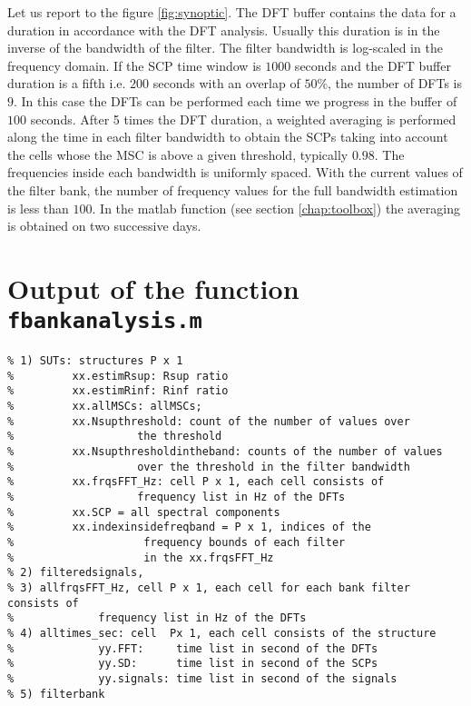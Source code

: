 Let us report to the figure \ref{fig:synoptic}. The DFT buffer contains the data for a duration in accordance with the DFT analysis. Usually this duration is in the inverse of the bandwidth of the filter. The filter bandwidth is log-scaled in the frequency domain. If the SCP time window is $1000$ seconds and the DFT buffer duration is  a fifth i.e. $200$ seconds with an overlap of $50\%$, the number of DFTs  is $9$. In this case the DFTs can be performed each time we progress in the buffer of $100$ seconds. After 5 times the DFT duration, a weighted averaging is performed along the time in each filter bandwidth to obtain the SCPs taking into account the cells whose the MSC is above a given threshold, typically $0.98$. The frequencies inside each bandwidth is uniformly spaced. With the current values of the filter bank, the number of frequency values for the full bandwidth estimation is less than $100$. In the matlab function (see section \ref{chap:toolbox}) the averaging is obtained on two successive days.



\newpage\clearpage
\section{Output of the function {\tt fbankanalysis.m}}

\begin{verbatim}
% 1) SUTs: structures P x 1
%         xx.estimRsup: Rsup ratio
%         xx.estimRinf: Rinf ratio
%         xx.allMSCs: allMSCs;
%         xx.Nsupthreshold: count of the number of values over
%                   the threshold
%         xx.Nsupthresholdintheband: counts of the number of values
%                   over the threshold in the filter bandwidth
%         xx.frqsFFT_Hz: cell P x 1, each cell consists of
%                   frequency list in Hz of the DFTs
%         xx.SCP = all spectral components
%         xx.indexinsidefreqband = P x 1, indices of the
%                    frequency bounds of each filter
%                    in the xx.frqsFFT_Hz
% 2) filteredsignals, 
% 3) allfrqsFFT_Hz, cell P x 1, each cell for each bank filter consists of
%             frequency list in Hz of the DFTs
% 4) alltimes_sec: cell  Px 1, each cell consists of the structure
%             yy.FFT:     time list in second of the DFTs
%             yy.SD:      time list in second of the SCPs
%             yy.signals: time list in second of the signals
% 5) filterbank



\end{verbatim}


